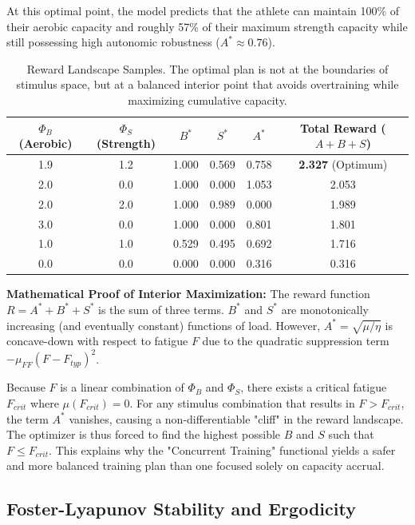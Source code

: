 At this optimal point, the model predicts that the athlete can maintain 100\% of their aerobic capacity and roughly 57\% of their maximum strength capacity while still possessing high autonomic robustness ($A^* \approx 0.76$).

\begin{table}[h]
\centering
\small
\begin{tabular}{@{}cccccc@{}}
\toprule
$\Phi_B$ (Aerobic) & $\Phi_S$ (Strength) & $B^*$ & $S^*$ & $A^*$ & Total Reward ($A+B+S$) \\
\midrule
1.9 & 1.2 & 1.000 & 0.569 & 0.758 & \textbf{2.327} (Optimum) \\
2.0 & 0.0 & 1.000 & 0.000 & 1.053 & 2.053 \\
2.0 & 2.0 & 1.000 & 0.989 & 0.000 & 1.989 \\
3.0 & 0.0 & 1.000 & 0.000 & 0.801 & 1.801 \\
1.0 & 1.0 & 0.529 & 0.495 & 0.692 & 1.716 \\
0.0 & 0.0 & 0.000 & 0.000 & 0.316 & 0.316 \\
\bottomrule
\end{tabular}
\caption{Reward Landscape Samples. The optimal plan is not at the boundaries of stimulus space, but at a balanced interior point that avoids overtraining while maximizing cumulative capacity.}
\label{tab:reward_landscape}
\end{table}

\textbf{Mathematical Proof of Interior Maximization:}
The reward function $R = A^* + B^* + S^*$ is the sum of three terms. $B^*$ and $S^*$ are monotonically increasing (and eventually constant) functions of load. However, $A^* = \sqrt{\mu / \eta}$ is concave-down with respect to fatigue $F$ due to the quadratic suppression term $-\mu_{FF}(F-F_{typ})^2$. 

Because $F$ is a linear combination of $\Phi_B$ and $\Phi_S$, there exists a critical fatigue $F_{crit}$ where $\mu(F_{crit}) = 0$. For any stimulus combination that results in $F > F_{crit}$, the term $A^*$ vanishes, causing a non-differentiable "cliff" in the reward landscape. The optimizer is thus forced to find the highest possible $B$ and $S$ such that $F \le F_{crit}$. This explains why the "Concurrent Training" functional yields a safer and more balanced training plan than one focused solely on capacity accrual.

\subsection{Foster-Lyapunov Stability and Ergodicity}

